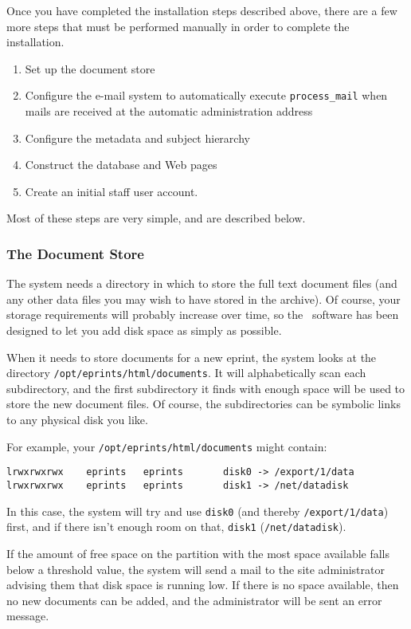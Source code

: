 Once you have completed the installation steps described above, there are a few more steps that must be performed manually in order to complete the installation.

\begin{enumerate}
\item Set up the document store
\item Configure the e-mail system to automatically execute {\tt process\_mail} when mails are received at the automatic administration address
\item Configure the metadata and subject hierarchy
\item Construct the database and Web pages
\item Create an initial staff user account.
\end{enumerate}

Most of these steps are very simple, and are described below.


\subsubsection{The Document Store}

The system needs a directory in which to store the full text document files (and any other data files you may wish to have stored in the archive). Of course, your storage requirements will probably increase over time, so the \eprints\ software has been designed to let you add disk space as simply as possible.

When it needs to store documents for a new eprint, the system looks at the directory {\tt /opt/eprints/html/documents}. It will alphabetically scan each subdirectory, and the first subdirectory it finds with enough space will be used to store the new document files. Of course, the subdirectories can be symbolic links to any physical disk you like.

For example, your {\tt /opt/eprints/html/documents} might contain:

\begin{verbatim}
lrwxrwxrwx    eprints   eprints       disk0 -> /export/1/data
lrwxrwxrwx    eprints   eprints       disk1 -> /net/datadisk
\end{verbatim}

In this case, the system will try and use {\tt disk0} (and thereby {\tt /export/1/data}) first, and if there isn't enough room on that, {\tt disk1} ({\tt /net/datadisk}).

If the amount of free space on the partition with the most space available falls below a threshold value, the system will send a mail to the site administrator advising them that disk space is running low. If there is no space available, then no new documents can be added, and the administrator will be sent an error message.

